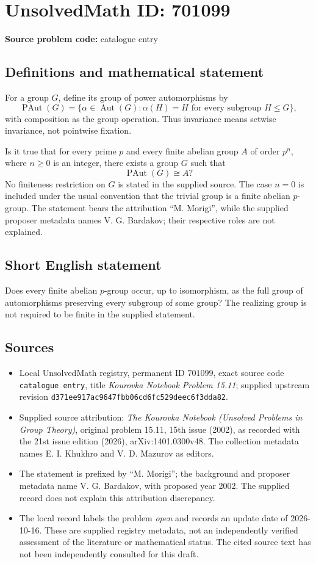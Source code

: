 \documentclass[11pt]{article}
\begin{document}
\section*{UnsolvedMath ID: 701099}
\textbf{Source problem code:} catalogue entry
\subsection{Definitions and mathematical statement}
For a group \(G\), define its group of power automorphisms by
\[
\operatorname{PAut}(G)=\{\alpha\in\operatorname{Aut}(G):\alpha(H)=H\text{ for every subgroup }H\leq G\},
\]
with composition as the group operation. Thus invariance means setwise invariance, not pointwise fixation.

Is it true that for every prime \(p\) and every finite abelian group \(A\) of order \(p^n\), where \(n\geq0\) is an integer, there exists a group \(G\) such that
\[
\operatorname{PAut}(G)\cong A?
\]
No finiteness restriction on \(G\) is stated in the supplied source. The case \(n=0\) is included under the usual convention that the trivial group is a finite abelian \(p\)-group. The statement bears the attribution ``M. Morigi'', while the supplied proposer metadata names V. G. Bardakov; their respective roles are not explained.
\subsection{Short English statement}
Does every finite abelian \(p\)-group occur, up to isomorphism, as the full group of automorphisms preserving every subgroup of some group? The realizing group is not required to be finite in the supplied statement.
\subsection{Sources}
\begin{itemize}
\item Local UnsolvedMath registry, permanent ID \(701099\), exact source code \texttt{catalogue entry}, title \emph{Kourovka Notebook Problem 15.11}; supplied upstream revision \texttt{d371ee917ac9647fbb06cd6fc529deec6f3dda82}.
\item Supplied source attribution: \emph{The Kourovka Notebook (Unsolved Problems in Group Theory)}, original problem 15.11, 15th issue (2002), as recorded with the 21st issue edition (2026), arXiv:1401.0300v48. The collection metadata names E. I. Khukhro and V. D. Mazurov as editors.
\item The statement is prefixed by ``M. Morigi''; the background and proposer metadata name V. G. Bardakov, with proposed year 2002. The supplied record does not explain this attribution discrepancy.
\item The local record labels the problem \emph{open} and records an update date of 2026-10-16. These are supplied registry metadata, not an independently verified assessment of the literature or mathematical status. The cited source text has not been independently consulted for this draft.
\end{itemize}
\end{document}
